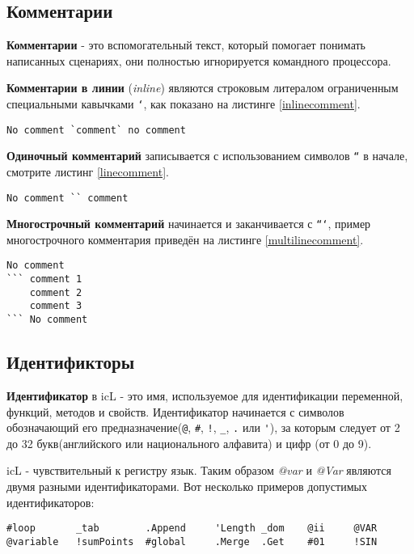 \documentclass[a4paper, 14pt]{extarticle}
\begin{document}
\subsection{Комментарии}

\textbf{Комментарии} - это вспомогательный текст, который помогает понимать написанных сценариях, они полностью игнорируется командного процессора.

\textbf{Комментарии в линии} (\textit{inline}) являются строковым литералом ограниченным специальными кавычками \texttt{`}, как показано на листинге \ref{inlinecomment}.

\begin{lstlisting}[caption=Комментарий в линии,label=inlinecomment]
No comment `comment` no comment
\end{lstlisting}

\textbf{Одиночный комментарий} записывается с использованием символов \texttt{``} в начале, смотрите листинг \ref{linecomment}.

\begin{lstlisting}[caption=Одиночный комментарий,label=linecomment]
No comment `` comment
\end{lstlisting}

\textbf{Многострочный комментарий} начинается и заканчивается с \texttt{```}, пример многострочного комментария приведён на листинге \ref{multilinecomment}.

\begin{lstlisting}[caption=Многострочный комментарий,label=multilinecomment]
No comment
``` comment 1
	comment 2
	comment 3
``` No comment
\end{lstlisting}

\subsection{Идентификторы}

\textbf{Идентификатор} в icL - это имя, используемое для идентификации переменной, функций, методов и свойств. Идентификатор начинается с символов обозначающий его предназначение(\lstinline`@`, \lstinline`#`, \lstinline`!`, \lstinline`_`, \lstinline`.` или \lstinline`'`), за которым следует от 2 до 32 букв(английского или национального алфавита) и цифр (от 0 до 9).

icL - чувствительный к регистру язык. Таким образом \textit{@var} и \textit{@Var} являются двумя разными идентификаторами. Вот несколько примеров допустимых идентификаторов:

\begin{lstlisting}[numbers=none]
#loop		_tab		.Append		'Length	_dom	@ii 	@VAR
@variable	!sumPoints	#global		.Merge	.Get	#01		!SIN
\end{lstlisting}
\end{document}
